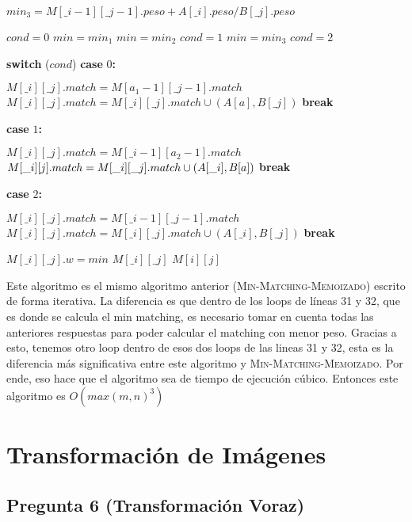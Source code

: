 \documentclass[12pt]{article}
\makeatletter
\newcommand{\SWITCH}[1]{\STATE \textbf{switch} (#1)}
\newcommand{\CASE}[1]{\STATE \textbf{case} #1\textbf{:} \begin{ALC@g}}
\newcommand{\ENDCASE}{\end{ALC@g}}
\makeatother
\begin{document}
\begin{algorithmic}[1]
            \STATE $min_3 = M[\_i - 1][\_j - 1].peso + A[\_i].peso / B[\_j].peso$
            
            \STATE $cond = 0$
            \STATE $min = min_1$
                \STATE $min = min_2$
                \STATE $cond = 1$
                \STATE $min = min_3$
                \STATE $cond = 2$
            \ENDIF
            
            \SWITCH{$cond$}
            \CASE{$0$}                                                     
                \STATE $M[\_i][\_j].match = M[a_1-1][\_j-1].match$
                    \STATE $M[\_i][\_j].match = M[\_i][\_j].match \cup (A[a],B[\_j])$
                \ENDFOR
                \STATE \textbf{break}
            \ENDCASE
            \CASE{$1$}                                                     
                \STATE $M[\_i][\_j].match = M[\_i-1][a_2-1].match$
                    \STATE $M[\_i][\-j].match = M[\_i][\_j].match \cup (A[\_i],B[a])$
                \ENDFOR
                \STATE \textbf{break}
            \ENDCASE
            \CASE{$2$}                                                     
                \STATE $M[\_i][\_j].match = M[\_i-1][\_j-1].match$
                \STATE $M[\_i][\_j].match = M[\_i][\_j].match \cup (A[\_i],B[\_j])$
                \STATE \textbf{break}
            \ENDCASE
            \STATE $M[\_i][\_j].w = min$
            \RETURN $M[\_i][\_j]$
        \ENDFOR
    \ENDFOR
    \RETURN $M[i][j]$
\end{algorithmic}

Este algoritmo es el mismo algoritmo anterior (\textsc{Min-Matching-Memoizado}) escrito de forma iterativa. La diferencia es que dentro de los loops de líneas 31 y 32, que es donde se calcula el min matching, es necesario tomar en cuenta todas las anteriores respuestas para poder calcular el matching con menor peso. Gracias a esto, tenemos otro loop dentro de esos dos loops de las lineas 31 y 32, esta es la diferencia más significativa entre este algoritmo y \textsc{Min-Matching-Memoizado}. Por ende, eso hace que el algoritmo sea de tiempo de ejecución cúbico. Entonces este algoritmo es $O(max(m,n)^3)$

\newpage
\section{Transformación de Imágenes}
\subsection*{Pregunta 6 (Transformación Voraz)}
\end{document}

